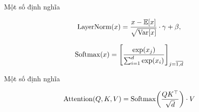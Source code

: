 \documentclass[tocsection,footlinesection,aspectratio=169,mathserif]{beamer}
\begin{document}
\begin{frame}{Một số định nghĩa}
	\begin{defn}
		\begin{equation}
			\LayerNorm\left(x\right)=\frac{x-\Ex\left[x\right]}{\sqrt{\Var\left[x\right]}}\cdot\gamma+\beta,
		\end{equation}
	\end{defn}

	\begin{defn}[Softmax]
		\begin{equation}
			\Softmax\left(x\right)=\left[\frac{\exp\left(x_{j}\right)}{\sum_{i=1}^{d}\exp\left(x_{i}\right)}\right]_{j=\overline{1,d}}
		\end{equation}
	\end{defn}
\end{frame}

\begin{frame}{Một số định nghĩa}
	\begin{defn}
		\begin{equation}
			\Attention\left(Q,K,V\right)=\Softmax\left(\frac{QK^{\top}}{\sqrt{d}}\right)\cdot V
		\end{equation}
	\end{defn}
\end{frame}
\end{document}
